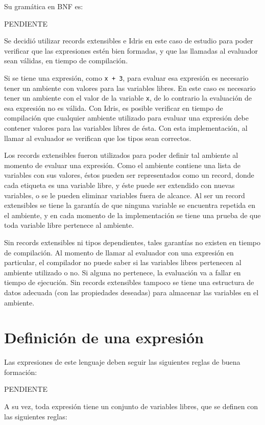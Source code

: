 Su gramática en BNF es:

PENDIENTE

Se decidió utilizar records extensibles e Idris en este caso de estudio para poder verificar que las expresiones estén bien formadas, y que las llamadas al evaluador sean válidas, en tiempo de compilación.

Si se tiene una expresión, como \texttt{x + 3}, para evaluar esa expresión es necesario tener un ambiente con valores para las variables libres. En este caso es necesario tener un ambiente con el valor de la variable \texttt{x}, de lo contrario la evaluación de esa expresión no es válida. Con Idris, es posible verificar en tiempo de compilación que cualquier ambiente utilizado para evaluar una expresión debe contener valores para las variables libres de ésta. Con esta implementación, al llamar al evaluador se verifican que los tipos sean correctos.

Los records extensibles fueron utilizados para poder definir tal ambiente al momento de evaluar una expresión. Como el ambiente contiene una lista de variables con sus valores, éstos pueden ser representados como un record, donde cada etiqueta es una variable libre, y éste puede ser extendido con nuevas variables, o se le pueden eliminar variables fuera de alcance. Al ser un record extensibles se tiene la garantía de que ninguna variable se encuentra repetida en el ambiente, y en cada momento de la implementación se tiene una prueba de que toda variable libre pertenece al ambiente.

Sin records extensibles ni tipos dependientes, tales garantías no existen en tiempo de compilación. Al momento de llamar al evaluador con una expresión en particular, el compilador no puede saber si las variables libres pertenecen al ambiente utilizado o no. Si alguna no pertenece, la evaluación va a fallar en tiempo de ejecución. Sin records extensibles tampoco se tiene una estructura de datos adecuada (con las propiedades deseadas) para almacenar las variables en el ambiente.

\section{Definición de una expresión}

Las expresiones de este lenguaje deben seguir las siguientes reglas de buena formación:

PENDIENTE

A su vez, toda expresión tiene un conjunto de variables libres, que se definen con las siguientes reglas:

